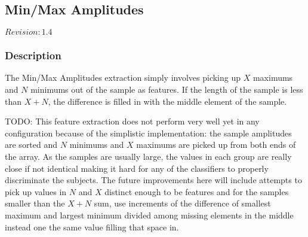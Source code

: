 \subsection{Min/Max Amplitudes}
\label{sect:minmax}

$Revision: 1.4 $

\subsubsection{Description}

The Min/Max Amplitudes extraction simply involves
picking up $X$ maximums and $N$ minimums out of the
sample as features. If the length of the sample
is less than $X+N$, the difference is filled in
with the middle element of the sample.

TODO: This feature extraction does not perform very well yet
in any configuration because of the simplistic implementation:
the sample amplitudes are sorted and $N$ minimums and $X$ maximums
are picked up from both ends of the array. As the samples are
usually large, the values in each group are really close if
not identical making it hard for any of the classifiers
to properly discriminate the subjects. The future improvements
here will include attempts to pick up values in $N$ and $X$
distinct enough to be features and for the samples smaller than the $X+N$ sum,
use increments of the difference of smallest maximum and
largest minimum divided among missing elements in the middle
instead one the same value filling that space in.

